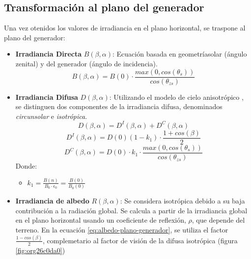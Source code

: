 \subsection{Transformación al plano del generador}
\label{sec:org2c746ed}
Una vez otenidos los valores de irradiancia en el plano horizontal, se traspone al plano del generador:
\begin{itemize}
\item \textbf{Irradiancia Directa} \(B(\beta ,\alpha)\): Ecuación basada en geometríasolar (ángulo zenital) y del generador (ángulo de incidencia).
\begin{equation}
B(\beta ,\alpha)=B(0)\cdot \frac{max(0,cos(\theta_s))}{cos(\theta_{zs})}
\label{eq:irradiancia-directa-plano-generador}
\end{equation}
\item \textbf{Irradiancia Difusa} \(D(\beta ,\alpha)\): Utilizando el modelo de cielo anisotrópico \cite{Perpinan2023}, se distinguen dos componentes de la irradiancia difusa, denominados \emph{circunsolar} e \emph{isotrópica}.  
\begin{equation}
D(\beta ,\alpha)=D^I(\beta ,\alpha)+D^C(\beta ,\alpha)
\end{equation}
\begin{equation}
D^I(\beta ,\alpha)=D(0)(1-k_1)\cdot \frac{1+cos(\beta)}{2}
\end{equation}
\begin{equation}
D^C(\beta, \alpha)=D(0)\cdot k_1\cdot \frac{max(0,cos(\theta_s))}{cos(\theta_{zs})}
\end{equation}
Donde:
\begin{itemize}
\item \(k_1=\frac{B(n)}{B_0\cdot \epsilon_0}=\frac{B(0)}{B_0(0)}\)
\end{itemize}
\item \textbf{Irradiancia de albedo} \(R(\beta ,\alpha)\): Se considera isotrópica debido a su baja contribución a la radiación global. Se calcula a partir de la irradiancia global en el plano horizontal usando un coeficiente de reflexión, \(\rho\), que depende del terreno. En la ecuación \ref{eq:albedo-plano-generador}, se utiliza el factor \(\frac{1-cos(\beta)}{2}\), complemetario al factor de visión de la difusa isotrópica (figura \ref{fig:org26c0da0})
\begin{equation}

\end{equation}
\end{itemize}
